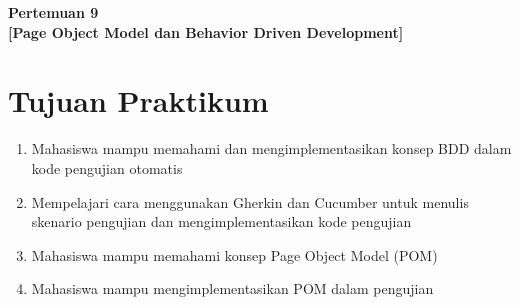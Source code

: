 \documentclass[a4paper,oneside,11pt]{book}
\newcommand{\Pertemuan}{9}
\newcommand{\Materi}{Page Object Model dan Behavior Driven Development}
\begin{document}


\renewcommand{\cfttoctitlefont}{\hfill\normalfont\LARGE\bfseries}
\renewcommand{\cftaftertoctitle}{\hfill}
\renewcommand{\cftbeforetoctitleskip}{1em}
\renewcommand{\cftaftertoctitleskip}{1.5em}

\renewcommand{\cftchappresnum}{Bab~}
\renewcommand{\cftchapaftersnum}{.}
\renewcommand{\cftchapnumwidth}{3.5em}
\renewcommand{\cftchapfont}{\bfseries}
\renewcommand{\cftchappagefont}{\bfseries}

\setlength{\cftbeforechapskip}{0.8em} %
\setlength{\cftbeforesecskip}{0.2em}  %
\renewcommand{\cftsecfont}{\normalfont}
\renewcommand{\cftsubsecfont}{\normalfont}

\renewcommand{\contentsname}{\centering Daftar Isi}
\renewcommand{\listfigurename}{\centering Daftar Gambar}
\renewcommand{\lstlistlistingname}{\centering Daftar Kode}

\renewcommand{\cftloftitlefont}{\hfill\normalfont\LARGE\bfseries}
\renewcommand{\cftafterloftitle}{\hfill}

\tableofcontents

\newpage
\listoffigures

\newpage
\lstlistoflistings

\newpage
\begin{center}
\textbf{\LARGE Pertemuan \Pertemuan\\
{[{\Materi}]}}
\end{center}

\section{Tujuan Praktikum}
\begin{enumerate}
    \item Mahasiswa mampu memahami dan mengimplementasikan konsep BDD dalam kode pengujian otomatis
    \item Mempelajari cara menggunakan Gherkin dan Cucumber untuk menulis skenario pengujian dan mengimplementasikan kode pengujian
    \item Mahasiswa mampu memahami konsep Page Object Model (POM)
    \item Mahasiswa mampu mengimplementasikan POM dalam pengujian
\end{enumerate}
\end{document}
